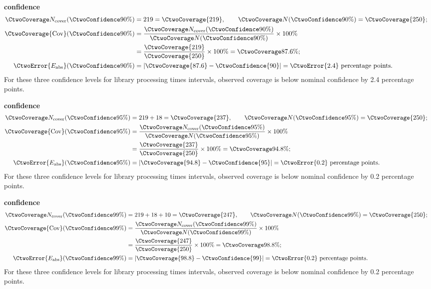 \textbf{ confidence}\nopagebreak[4]
\begin{align*}
\CtwoCoverCount(\CtwoConfidence{90\%})&=219=\CtwoCoverage{219},
\qquad\CtwoTotalCount(\CtwoConfidence{90\%})=\CtwoCoverage{250};\\
\CtwoCoverage{\mathrm{Cov}}(\CtwoConfidence{90\%})
&=\frac{\CtwoCoverCount(\CtwoConfidence{90\%})}{\CtwoTotalCount(\CtwoConfidence{90\%})}\times100\%
\\
&=\frac{\CtwoCoverage{219}}{\CtwoCoverage{250}}\times100\%=\CtwoCoverage{87.6\%};\\
\CtwoError{E_{\rm abs}}(\CtwoConfidence{90\%})
&=\left|\CtwoCoverage{87.6}-\CtwoConfidence{90}\right|=\CtwoError{2.4}\ \text{percentage points}.
\end{align*}
For these three confidence levels for library processing times intervals, observed coverage is below nominal confidence by 2.4 percentage points.

\textbf{ confidence}\nopagebreak[4]
\begin{align*}
\CtwoCoverCount(\CtwoConfidence{95\%})&=219+18=\CtwoCoverage{237},
\qquad\CtwoTotalCount(\CtwoConfidence{95\%})=\CtwoCoverage{250};\\
\CtwoCoverage{\mathrm{Cov}}(\CtwoConfidence{95\%})
&=\frac{\CtwoCoverCount(\CtwoConfidence{95\%})}{\CtwoTotalCount(\CtwoConfidence{95\%})}\times100\%
\\
&=\frac{\CtwoCoverage{237}}{\CtwoCoverage{250}}\times100\%=\CtwoCoverage{94.8\%};\\
\CtwoError{E_{\rm abs}}(\CtwoConfidence{95\%})
&=\left|\CtwoCoverage{94.8}-\CtwoConfidence{95}\right|=\CtwoError{0.2}\ \text{percentage points}.
\end{align*}
For these three confidence levels for library processing times intervals, observed coverage is below nominal confidence by 0.2 percentage points.

\clearpage
\textbf{ confidence}\nopagebreak[4]
\begin{align*}
\CtwoCoverCount(\CtwoConfidence{99\%})&=219+18+10=\CtwoCoverage{247},
\qquad\CtwoTotalCount(\CtwoConfidence{99\%})=\CtwoCoverage{250};\\
\CtwoCoverage{\mathrm{Cov}}(\CtwoConfidence{99\%})
&=\frac{\CtwoCoverCount(\CtwoConfidence{99\%})}{\CtwoTotalCount(\CtwoConfidence{99\%})}\times100\%
\\
&=\frac{\CtwoCoverage{247}}{\CtwoCoverage{250}}\times100\%=\CtwoCoverage{98.8\%};\\
\CtwoError{E_{\rm abs}}(\CtwoConfidence{99\%})
&=\left|\CtwoCoverage{98.8}-\CtwoConfidence{99}\right|=\CtwoError{0.2}\ \text{percentage points}.
\end{align*}
For these three confidence levels for library processing times intervals, observed coverage is below nominal confidence by 0.2 percentage points.

